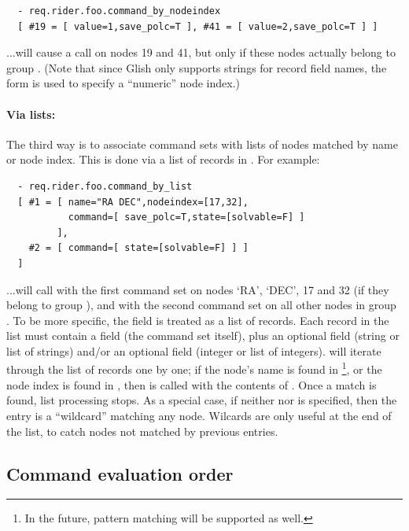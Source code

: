 \begin{verbatim}
  - req.rider.foo.command_by_nodeindex
  [ #19 = [ value=1,save_polc=T ], #41 = [ value=2,save_polc=T ] ]
\end{verbatim}

  ...will cause a  call on nodes 19 and 41, but only if
  these nodes actually belong to group . (Note that since Glish only
  supports strings for record field names, the  form is used
  to specify a ``numeric'' node index.)

  \paragraph{Via lists:} The third way is to associate command sets with  lists
  of nodes matched by name or node index. This is done via a list of records
  in . For example:

\begin{verbatim}
  - req.rider.foo.command_by_list
  [ #1 = [ name="RA DEC",nodeindex=[17,32],
           command=[ save_polc=T,state=[solvable=F] ] 
         ],  
    #2 = [ command=[ state=[solvable=F] ] ] 
  ]
\end{verbatim}

  ...will call  with the first command set on nodes `RA',
  `DEC', 17 and 32 (if they belong to group ), and with the second
  command set on all other nodes in group . To be more specific, the
   field is treated as a list of records. Each record in
  the list must contain a  field (the command set itself),  plus an
  optional  field (string or list of strings) and/or an optional
   field (integer or list of integers).  will
  iterate through the list of records one by one; if the node's name is found
  in \footnote{In the future, pattern matching will be supported as
  well.}, or the node index is found in , then
   is called with the contents of . Once a
  match is found, list processing stops. As a special case, if neither
   nor  is specified, then the entry is a ``wildcard''
  matching any node. Wilcards are only useful at the end of the list, to catch
  nodes not matched by previous entries.

\subsection{Command evaluation order}

